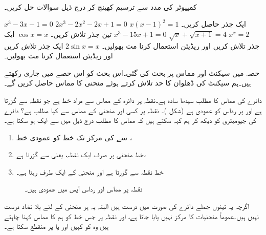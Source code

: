 \\
کمپیوٹر کی مدد سے ترسیم کھینچ کر درج ذیل سوالات حل کریں۔

$x^3-3x-1=0$
$2x^3-2x^2-2x+1=0$
$x(x-1)^2=1$  
ایک جذر حاصل کریں۔
$x^x=2$
$\sqrt{x}+\sqrt{x+1}=4$
$x^3-15x+1=0$
تین جذر تلاش کریں۔
$\cos x=x$
ایک جذر تلاش کریں اور ریڈیئن استعمال کرنا مت بھولیں۔
$2\sin x=x$
ایک جذر تلاش کریں اور ریڈیئن استعمال کرنا مت بھولیں۔


حصہ  میں سیکنٹ اور مماس پر بحث کی گئی۔اس بحث کو اس حصے میں جاری رکھتے ہیں۔ہم سیکنٹ کی ڈھلوان کا حد تلاش کرتے ہوئے منحنی کا مماس حاصل کریں گے۔

دائرے کی مماس  کا مطلب سیدھا سادہ ہے۔نقطہ  پر دائرہ  کے مماس سے مراد خط  ہے جو نقطہ  سے گزرتا ہے  اور   پر رداس کو عمودی  ہے (شکل )۔  نقطہ  پر کسی اور منحنی  کے مماس سے کیا مطلب ہے؟ دائرے کی جیومیٹری کو دیکھ کر ہم کہہ سکتے ہیں کہ مماس کا مطلب درج ذیل میں سے ایک ہو سکتا ہے۔
\begin{enumerate}[1.]
\item
{} سے  کی مرکز تک خط کو عمودی خط ،
\item
خط  منحنی  پر صرف ایک نقطہ، یعنی  سے گزرتا ہے،
\item
 خط  نقطہ  سے گزرتا ہے اور منحنی  کے ایک طرف رہتا ہے۔ 
\end{enumerate} 
\begin{figure}
\centering
{}
\caption{
نقطہ  پر مماس اور رداس آپس میں عمودی ہیں۔
}
\label{شکل_حد_مماس_دائرہ}
\end{figure}

اگرچہ یہ تینوں جملے دائرے کی صورت میں درست ہیں البتہ یہ ہر منحنی کے لئے بلا تضاد  درست نہیں ہیں۔عموماً منحنیات کا مرکز نہیں پایا جاتا ہے،  اور نقطہ  پر جس خط کو ہم  کا مماس کہنا  چاہتے ہیں  وہ    کو کہیں اور یا  پر منقطع  سکتا ہے۔  

